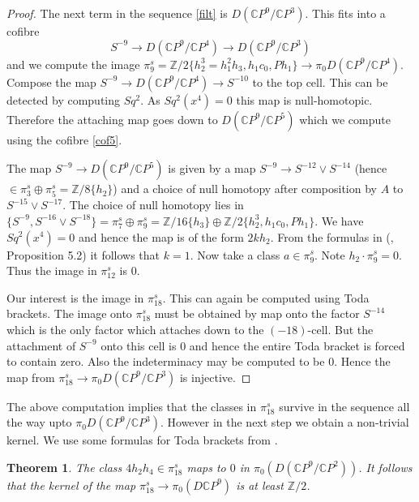 \documentclass[a4paper,leqno,12pt]{amsart}
\theoremstyle{plain}
\newtheorem{theorem}{Theorem}[section]
\theoremstyle{definition}
\numberwithin{equation}{section}
\begin{document}
\begin{proof}
The next term in the sequence \ref{filt} is $D({\mathbb{C}} P^9/ {\mathbb{C}} P^3)$. This fits into a cofibre 
$$S^{-9} \to D({\mathbb{C}} P^9/ {\mathbb{C}} P^4) \to D({\mathbb{C}} P^9/{\mathbb{C}} P^3)  $$
and we compute the image $\pi_9^s = {\mathbb{Z}}/2\{h_2^3=h_1^2h_3,h_1c_0,Ph_1\} \to \pi_0 D({\mathbb{C}} P^9/ {\mathbb{C}} P^4)$. Compose the map $S^{-9} \to D({\mathbb{C}} P^9/{\mathbb{C}} P^4) \to S^{-10}$ to the top cell. This can be detected by computing $Sq^2$. As $Sq^2(x^4)=0$ this map is null-homotopic. Therefore the attaching map goes down to $D({\mathbb{C}} P^9/{\mathbb{C}} P^5)$ which we compute using the cofibre \ref{cof5}.  

The map $S^{-9} \to D({\mathbb{C}} P^9/ {\mathbb{C}} P^5)$ is given by a map $S^{-9} \to S^{-12} \vee S^{-14}$ (hence $\in \pi_3^s \oplus \pi_5^s = {\mathbb{Z}}/8\{h_2\}$) and a choice of null homotopy after composition by $A$ to $S^{-15}\vee S^{-17}$. The choice of null homotopy lies in $\{S^{-9}, S^{-16}\vee S^{-18}\} = \pi_7^s\oplus \pi_9^s= {\mathbb{Z}}/16 \{h_3\}\oplus {\mathbb{Z}}/2\{h_2^3,h_1c_0,Ph_1\}$.  We have $Sq^2(x^4)= 0$ and hence the map is of the form $2kh_2$. From the formulas in (\cite{Mos68}, Proposition 5.2) it follows that $k=1$. Now take a class $a \in \pi_{9}^s$. Note $h_2\cdot \pi_9^s =0$.  Thus the image in $\pi_{12}^s$ is $0$. 

Our interest is the image in $\pi_{18}^s$. This can again be computed using Toda brackets. The image onto $\pi_{18}^s$ must be obtained by map onto the factor $S^{-14}$ which is the only factor which attaches down to the $(-18)$-cell. But the attachment of $S^{-9}$ onto this cell is $0$ and hence the entire Toda bracket is forced to contain zero. Also the indeterminacy may be computed to be $0$. Hence the map from $\pi_{18}^s \to \pi_0 D({\mathbb{C}} P^9/ {\mathbb{C}} P^3)$ is injective. 
\end{proof}

The above computation implies that the classes in $\pi_{18}^s$ survive in the sequence all the way upto $\pi_0 D({\mathbb{C}} P^9/{\mathbb{C}} P^3)$. However in the next step we obtain a non-trivial kernel. We use some formulas for Toda brackets from \cite{Koch96}.
\begin{theorem}\label{main18}
The class $4h_2h_4\in \pi_{18}^s$ maps to $0$ in $\pi_0(D({\mathbb{C}} P^9/{\mathbb{C}} P^2))$. It follows that the kernel of the map $\pi_{18}^s \to \pi_0(D{\mathbb{C}} P^9)$ is at least ${\mathbb{Z}}/2$. 
\end{theorem}
\end{document}
